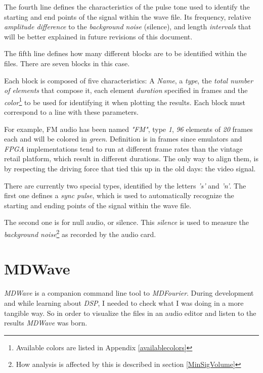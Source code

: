 \documentclass[10pt,a4paper]{report}
\begin{document}
\begin{appendices}
The fourth line defines the characteristics of the pulse tone used to identify the starting and end points of the signal within the wave file. Its frequency, relative \textit{amplitude difference} to the \textit{background noise} (silence), and length \textit{intervals} that will be better explained in future revisions of this document.

The fifth line defines how many different blocks are to be identified within the files. There are seven blocks in this case.

Each block is composed of five characteristics: A \textit{Name}, a \textit{type}, the \textit{total number of elements} that compose it, each element \textit{duration} specified in frames and the \textit{color}\footnote{Available colors are listed in Appendix \ref{availablecolors}} to be used for identifying it when plotting the results. Each block must correspond to a line with these parameters.

For example, FM audio has been named \textit{"FM"}, type \textit{1}, \textit{96} elements of \textit{20} frames each and will be colored in \textit{green}. Definition is in frames since emulators and \textit{FPGA} implementations tend to run at different frame rates than the vintage retail platform, which result in different durations. The only way to align them, is by respecting the driving force that tied this up in the old days: the video signal.

There are currently two special types, identified by the letters \textit{'s'} and \textit{'n'}. The first one defines a \textit{sync pulse}, which is used to automatically recognize the starting and ending points of the signal within the wave file. 

The second one is for null audio, or silence. This \textit{silence} is used to measure the \textit{background noise}\footnote{How analysis is affected by this is described in section \ref{MinSigVolume}} as recorded by the audio card. 	
	
\chapter{MDWave}
\label{mdwave}

\textit{MDWave} is a companion command line tool to \textit{MDFourier}. During development and while learning about \textit{DSP}, I needed to check what I was doing in a more tangible way. So in order to visualize the files in an audio editor and listen to the results \textit{MDWave} was born.


\end{appendices}
\end{document}
